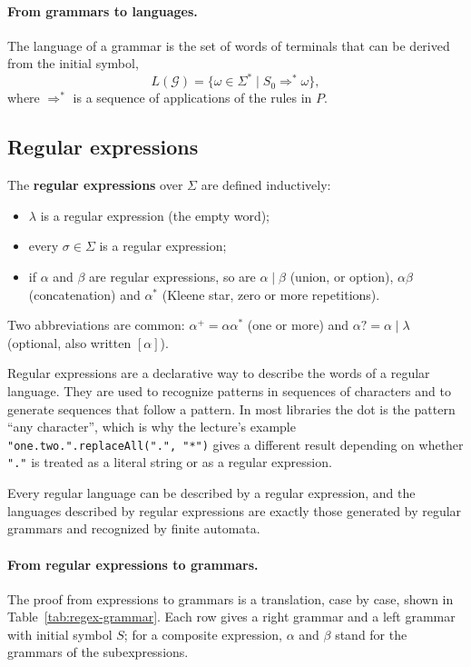 \paragraph{From grammars to languages.} The language of a grammar is the set of
words of terminals that can be derived from the initial symbol,
\[
L(\mathcal{G}) = \{ \omega \in \Sigma^* \mid S_0 \Rightarrow^* \omega \},
\]
where $\Rightarrow^*$ is a sequence of applications of the rules in $P$.

\subsection{Regular expressions}

\begin{definition}
The \textbf{regular expressions} over $\Sigma$ are defined inductively:
\begin{itemize}
  \item $\lambda$ is a regular expression (the empty word);
  \item every $\sigma \in \Sigma$ is a regular expression;
  \item if $\alpha$ and $\beta$ are regular expressions, so are $\alpha \mid \beta$
    (union, or option), $\alpha\beta$ (concatenation) and $\alpha^*$ (Kleene star,
    zero or more repetitions).
\end{itemize}
Two abbreviations are common: $\alpha^+ = \alpha\alpha^*$ (one or more) and
$\alpha? = \alpha \mid \lambda$ (optional, also written $[\alpha]$).
\end{definition}

Regular expressions are a declarative way to describe the words of a regular
language. They are used to recognize patterns in sequences of characters and
to generate sequences that follow a pattern. In most libraries the dot is the
pattern ``any character'', which is why the lecture's example
\texttt{"one.two.".replaceAll(".", "*")} gives a different result depending
on whether \texttt{"."} is treated as a literal string or as a regular
expression.

\begin{theorem}
Every regular language can be described by a regular expression, and the
languages described by regular expressions are exactly those generated by
regular grammars and recognized by finite automata.
\end{theorem}

\paragraph{From regular expressions to grammars.} The proof from expressions
to grammars is a translation, case by case, shown in
Table~\ref{tab:regex-grammar}. Each row gives a right grammar and a left
grammar with initial symbol $S$; for a composite expression, $\alpha$ and
$\beta$ stand for the grammars of the subexpressions.


